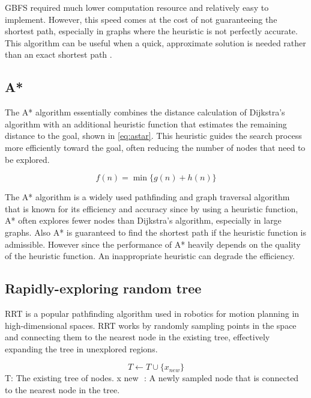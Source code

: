 \documentclass[12pt]{report}
\begin{document}
        GBFS required much lower computation resource and relatively easy to implement. However, this speed comes at the
        cost of not guaranteeing the shortest path, especially in graphs where the heuristic is not perfectly accurate.
        This algorithm can be useful when a quick, approximate solution is needed rather than an exact shortest path
        \cite{russell_artificial_2016}.

        \subsection{A*}
        The A* algorithm essentially combines the distance calculation of Dijkstra's algorithm with an additional
        heuristic function that estimates the remaining distance to the goal, shown in \ref{eq:astar}. This heuristic
        guides the search process more efficiently toward the goal, often reducing the number of nodes that need to be
        explored. 

        \begin{equation}\label{eq:astar}
            f(n) = \min_{} \{g(n) + h(n)\}
        \end{equation}

        The A* algorithm is a widely used pathfinding and graph traversal algorithm that is known for its efficiency and
        accuracy since by using a heuristic function, A* often explores fewer nodes than Dijkstra's algorithm,
        especially in large graphs. Also A* is guaranteed to find the shortest path if the heuristic function is
        admissible. However since the performance of A* heavily depends on the quality of the heuristic function. An
        inappropriate heuristic can degrade the efficiency.
        
        \subsection{Rapidly-exploring random tree}
        \ac{RRT} is a popular pathfinding algorithm used in robotics for motion planning in high-dimensional spaces. RRT
        works by randomly sampling points in the space and connecting them to the nearest node in the existing tree,
        effectively expanding the tree in unexplored regions.

        \begin{equation}
            T \leftarrow T \cup \{ x_{new} \}
        \end{equation}
T: The existing tree of nodes.
x new ​ : A newly sampled node that is connected to the nearest node in the tree.
\end{document}
